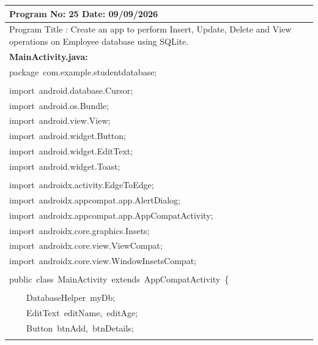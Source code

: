 \documentclass[a4paper,12pt]{article}
\begin{document}
\newpage

\noindent\begingroup
\renewcommand{\arraystretch}{1.1}
\begin{longtable}{|p{}|}
\hline\endfirsthead\hline\endhead\hline\endfoot\hline\endlastfoot
\rule{0pt}{13pt}Program No: 25 \hfill Date: 09/09/2026 \\
\hline
\rule{0pt}{13pt}Program Title : Create an app to perform Insert, Update, Delete and View operations on Employee database using SQLite. \\
\hline
\rule{0pt}{13pt}\textbf{MainActivity.java:} \\
\hline
{\ttfamily\small package\ com.example.studentdatabase;} \\
\strut \\
{\ttfamily\small import\ android.database.Cursor;} \\
{\ttfamily\small import\ android.os.Bundle;} \\
{\ttfamily\small import\ android.view.View;} \\
{\ttfamily\small import\ android.widget.Button;} \\
{\ttfamily\small import\ android.widget.EditText;} \\
{\ttfamily\small import\ android.widget.Toast;} \\
\strut \\
{\ttfamily\small import\ androidx.activity.EdgeToEdge;} \\
{\ttfamily\small import\ androidx.appcompat.app.AlertDialog;} \\
{\ttfamily\small import\ androidx.appcompat.app.AppCompatActivity;} \\
{\ttfamily\small import\ androidx.core.graphics.Insets;} \\
{\ttfamily\small import\ androidx.core.view.ViewCompat;} \\
{\ttfamily\small import\ androidx.core.view.WindowInsetsCompat;} \\
\strut \\
{\ttfamily\small public\ class\ MainActivity\ extends\ AppCompatActivity\ \{} \\
\strut \\
{\ttfamily\small \ \ \ \ DatabaseHelper\ myDb;} \\
{\ttfamily\small \ \ \ \ EditText\ editName,\ editAge;} \\
{\ttfamily\small \ \ \ \ Button\ btnAdd,\ btnDetails;} \\
\strut \\

\end{longtable}
\end{document}

